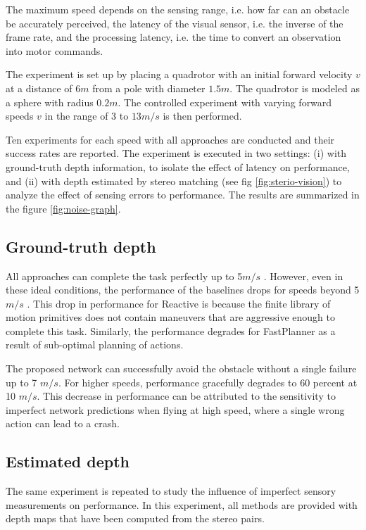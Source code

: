 The maximum speed depends on the sensing range, i.e. how far can an obstacle be accurately perceived, the latency of the visual sensor, i.e. the inverse of the frame rate, and the processing latency, i.e. the time to convert an observation into motor commands. 

The experiment is set up by placing a quadrotor with an initial forward velocity $v$ at a distance of $6 m$ from a pole with diameter $1.5 m$. The quadrotor is modeled as a sphere with radius $0.2 m$. The controlled experiment with varying forward speeds $v$ in the range of 3 to $13 m/s$ is then performed.

Ten experiments for each speed with all approaches are conducted and their success rates are reported. The experiment is executed in two settings: (i) with ground-truth depth information, to isolate the effect of latency on performance, and (ii) with depth estimated by stereo matching\cite{stereoMatching} (see fig \ref{fig:sterio-vision}) to analyze the effect of sensing errors to performance. The results are summarized in the figure \ref{fig:noise-graph}.

\subsection{Ground-truth depth}
All approaches can complete the task perfectly up to 5$m/s$ . However, even in these ideal conditions, the performance of the baselines drops for speeds beyond 5$m/s$ . This drop in performance for Reactive\cite{reactive_method} is because the finite library of motion primitives does not contain maneuvers that are aggressive enough to complete this task. Similarly, the performance degrades for FastPlanner\cite{fastPlanner} as a result of sub-optimal planning of actions. 

The proposed network can successfully avoid the obstacle without a single failure up to 7 $m/s$. For higher speeds, performance gracefully degrades to 60 percent at 10 $m/s$. This decrease in performance can be attributed to the sensitivity to imperfect network predictions when flying at high speed, where a single wrong action can lead to a crash. 

\subsection{Estimated depth}
The same experiment is repeated to study the influence of imperfect sensory measurements on performance. In this experiment, all methods are provided with depth maps that have been computed from the stereo pairs.   

